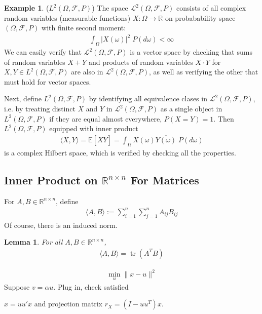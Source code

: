 \documentclass[12pt]{article}
\numberwithin{equation}{section} %
\theoremstyle{plain}
\newtheorem{lem}[thm]{Lemma}
\theoremstyle{definition}
\newtheorem{ex}[thm]{Example}
\theoremstyle{remark}
\newcommand{\ra}{\rightarrow}
\newcommand{\trace}{\operatorname{tr}}
\newcommand{\sF}{\mathscr{F}}
\newcommand{\sL}{\mathscr{L}}
\newcommand{\R}{\mathbb{R}}
\newcommand{\E}{\mathbb{E}}
\begin{document}
\begin{ex}($L^2(\Omega,\sF,P)$)
The space $\sL^2(\Omega,\sF,P)$ consists of all complex random variables
(measurable functions) $X:\Omega\ra \R$ on probabability space
$(\Omega,\sF,P)$ with finite second moment:
\begin{align*}
  \int_\Omega |X(\omega)|^2 \; P(d\omega) <\infty
\end{align*}
We can easily verify that $\sL^2(\Omega,\sF,P)$ is a vector space by
checking that sums of random variables $X+Y$ and
products of random variables $X\cdot Y$ for $X,Y\in L^2(\Omega,\sF,P)$
are also in $\sL^2(\Omega,\sF,P)$, as well as verifying the other that
must hold for vector spaces.

Next, define $L^2(\Omega,\sF,P)$ by identifying all equivalence clases
in $\sL^2(\Omega,\sF,P)$, i.e. by treating distinct $X$ and $Y$
in $\sL^2(\Omega,\sF,P)$ as a single object in $L^2(\Omega,\sF,P)$ if
they are equal almost everywhere, $P(X=Y)=1$. Then
$L^2(\Omega,\sF,P)$ equipped with inner product
\begin{align*}
  \langle X,Y \rangle
  = \E[X\overline{Y}]
  = \int_\Omega X(\omega)\overline{Y(\omega)} \; P(d\omega)
\end{align*}
is a complex Hilbert space, which is verified by checking all the
properties.
\end{ex}



\clearpage
\subsection{Inner Product on $\R^{n\times n}$ For Matrices}

For $A,B\in\R^{n\times n}$, define
\begin{align*}
  \langle A,B\rangle
  := \sum_{i=1}^n\sum_{j=1}^n A_{ij}B_{ij}
\end{align*}
Of course, there is an induced norm.

\begin{lem}
For all $A,B\in\R^{n\times n}$,
\begin{align*}
  \langle A,B\rangle
  =
  \trace(A^TB)
\end{align*}
\end{lem}

\begin{align*}
  \min_u \lVert x-u\rVert^2
\end{align*}
Suppose $v=\alpha u$.
Plug in, check satisfied

$\hat{x}=uu'x$
and projection matrix
$r_X=(I-uu^T)x$.
\end{document}
